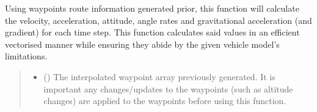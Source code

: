 \documentclass[letterpaper,10pt,english]{sphinxmanual}
\begin{document}
\begin{fulllineitems}
\label{\detokenize{modules/waypoints/generation:qnav.waypoints.generation.get_trajectory_values}}
\pysigstartsignatures
{}
\pysigstopsignatures
\sphinxAtStartPar
Using waypoints route information generated prior, this function will
calculate the velocity, acceleration, attitude, angle rates and
gravitational acceleration (and gradient) for each time step. This
function calculates said values in an efficient vectorised manner
while ensuring they abide by the given vehicle model’s limitations.
\begin{quote}\begin{description}
\begin{itemize}
\item {} 
\sphinxAtStartPar
{} (\sphinxstyleliteralemphasis{\sphinxupquote{ (}}\sphinxstyleliteralemphasis{\sphinxupquote{)}}) \textendash{} The interpolated waypoint array previously generated. It
is important any changes/updates to the waypoints (such as altitude
changes) are applied to the waypoints before using this function.


\end{itemize}
\end{description}
\end{quote}
\end{fulllineitems}
\end{document}
